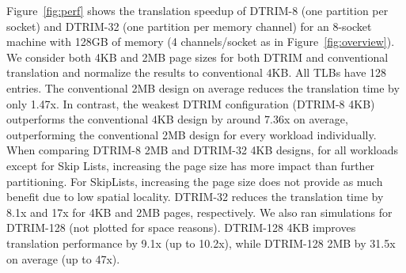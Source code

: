 Figure~\ref{fig:perf} shows the translation speedup of DTRIM-8 (one partition per socket) and DTRIM-32 (one partition per memory channel) for an 8-socket machine with 128GB of memory (4 channels/socket as in Figure~\ref{fig:overview}). We consider both 4KB and 2MB page sizes for both DTRIM and conventional translation and normalize the results to conventional $4$KB. All TLBs have 128 entries. The conventional 2MB design on average reduces the translation time by only 1.47x. In contrast, the weakest DTRIM configuration (DTRIM-8 4KB) outperforms the conventional $4$KB design by around 7.36x on average, outperforming the conventional 2MB design for every workload individually. When comparing DTRIM-8 2MB and DTRIM-32 4KB designs, for all workloads except for Skip Lists, increasing the page size has more impact than further partitioning. For SkipLists, increasing the page size does not provide as much benefit due to low spatial locality. DTRIM-32 reduces the translation time by 8.1x and 17x for 4KB and 2MB pages, respectively. We also ran simulations for DTRIM-128 (not plotted for space reasons). DTRIM-128 4KB improves translation performance by 9.1x (up to 10.2x), while  DTRIM-128 2MB by 31.5x on average (up to 47x).
